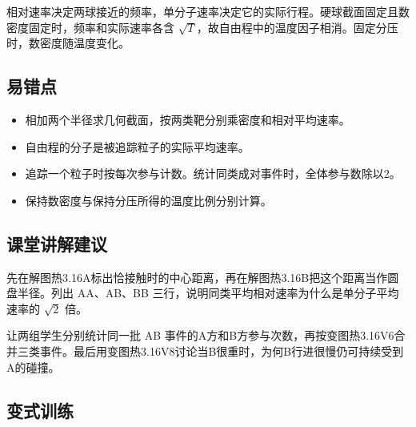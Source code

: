 \documentclass[UTF8,fontset=fandol,a4paper,11pt]{ctexart}
\begin{document}
相对速率决定两球接近的频率，单分子速率决定它的实际行程。硬球截面固定且数密度固定时，频率和实际速率各含 $\sqrt T$，故自由程中的温度因子相消。固定分压时，数密度随温度变化。



\subsection*{易错点}

\begin{itemize}
\item 相加两个半径求几何截面，按两类靶分别乘密度和相对平均速率。
\item 自由程的分子是被追踪粒子的实际平均速率。
\item 追踪一个粒子时按每次参与计数。统计同类成对事件时，全体参与数除以2。
\item 保持数密度与保持分压所得的温度比例分别计算。
\end{itemize}



\subsection*{课堂讲解建议}

先在解图热3.16A标出恰接触时的中心距离，再在解图热3.16B把这个距离当作圆盘半径。列出 AA、AB、BB 三行，说明同类平均相对速率为什么是单分子平均速率的 $\sqrt2$ 倍。

让两组学生分别统计同一批 AB 事件的A方和B方参与次数，再按变图热3.16V6合并三类事件。最后用变图热3.16V8讨论当B很重时，为何B行进很慢仍可持续受到A的碰撞。



\subsection*{变式训练}
\end{document}
